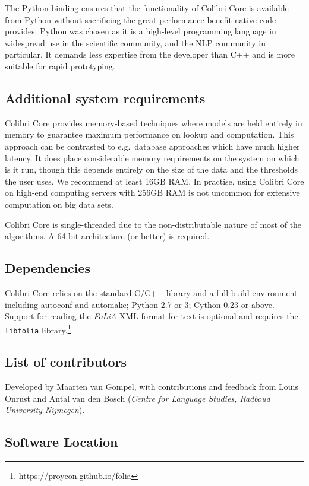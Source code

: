 \documentclass[a4paper,12pt]{article}
\begin{document}
The Python binding ensures that the functionality of Colibri Core is available
from Python without sacrificing the great performance benefit native code
provides. Python was chosen as it is a high-level programming language in
widespread use in the scientific community, and the NLP community in
particular. It demands less expertise from the developer than C++ and is more
suitable for rapid prototyping.

\subsection{Additional system requirements}

Colibri Core provides memory-based techniques where models are held entirely in
memory to guarantee maximum performance on lookup and computation.  This
approach can be contrasted to e.g.\ database approaches which have much higher
latency.  It does place considerable memory requirements on the system on which
is it run, though this depends entirely on the size of the data and the
thresholds the user uses.  We recommend at least 16GB RAM. In practise, using Colibri
Core on high-end computing servers with 256GB RAM is not uncommon for extensive
computation on big data sets.

Colibri Core is single-threaded due to the non-distributable nature of most of the
algorithms. A 64-bit architecture (or better) is required.

\subsection{Dependencies}

Colibri Core relies on the standard C/C++ library and a full build environment including autoconf and
automake; Python 2.7 or 3; Cython 0.23 or above. Support for reading the
\emph{FoLiA} XML format for text is optional and requires the \texttt{libfolia}
library.\footnote{https://proycon.github.io/folia}

\subsection{List of contributors}

Developed by Maarten van Gompel, with contributions and feedback from Louis
Onrust and Antal van den Bosch (\emph{Centre for Language Studies, Radboud
University Nijmegen}).

\subsection{Software Location}
\end{document}
